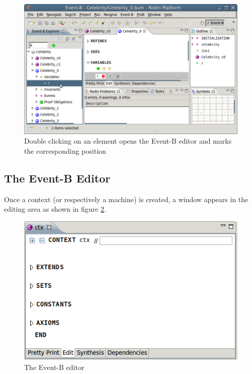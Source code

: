 \begin{figure}[!h]
\begin{center}
	\includegraphics{img/reference/ref_01_project_explorer1.png}
	\caption{Double clicking on an element opens the Event-B editor and marks the corresponding position}
	\label{fig_ref_01_project_explorer1}
\end{center}
\end{figure}

\subsection{The Event-B Editor}
\label{ref_01_the_eventb_editor}

Once a context (or respectively a machine) is created, a window appears in the editing area as shown in figure \ref{fig_ref_01_eventb_editor1}.

\begin{figure}[!h]
\begin{center}
	\includegraphics{img/reference/ref_01_eventb_editor1.png}
	\caption{The Event-B editor}
	\label{fig_ref_01_eventb_editor1}
\end{center}
\end{figure}

